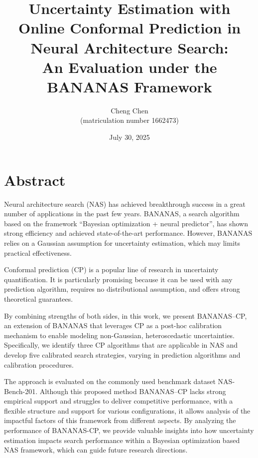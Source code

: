 \documentclass[a4paper,oneside,bibliography=totoc]{scrbook}
\begin{document}
\setlength{\skip\footins}{20pt}
\frontmatter \subject{Master Thesis} %
\title{\LARGE 
	Uncertainty Estimation with Online Conformal Prediction in Neural Architecture Search: \\ 
	An Evaluation under the BANANAS Framework 
}
\author{
	Cheng Chen\\ (matriculation number 1662473)} \date{July 30, 2025
}
\publishers{
	{\small Submitted to}\\
	Data and Web Science Group\\Prof.\ Dr.\ Margret Keuper\\University of Mannheim\\
}
\maketitle

\chapter{Abstract}
Neural architecture search (NAS) has achieved breakthrough success in a great number of applications in the past few years. BANANAS, a search algorithm based on the framework “Bayesian optimization + neural predictor”, has shown strong efficiency and achieved state-of-the-art performance. However, BANANAS relies on a Gaussian assumption for uncertainty estimation, which may limits practical effectiveness. 

Conformal prediction (CP) is a popular line of research in uncertainty quantification. It is particularly promising because it can be used with any prediction algorithm, requires no distributional assumption, and offers strong theoretical guarantees.
 
By combining strengths of both sides, in this work, we present BANANAS--CP, an extension of BANANAS that leverages CP as a post-hoc calibration mechanism to enable modeling non-Gaussian, heteroscedastic uncertainties. Specifically, we identify three CP algorithms that are applicable in NAS and develop five calibrated search strategies, varying in  prediction algorithms and calibration procedures. 

The approach is evaluated on the commonly used benchmark dataset NAS-Bench-201. Although this proposed method BANANAS--CP lacks strong empirical support and struggles to deliver competitive performance, with a flexible structure and support for various configurations, it allows analysis of the impactful factors of this framework from different aspects. By analyzing the performance of BANANAS-CP, we provide valuable insights into how uncertainty estimation impacts search performance within a Bayesian optimization based NAS framework, which can guide future research directions.
\end{document}
